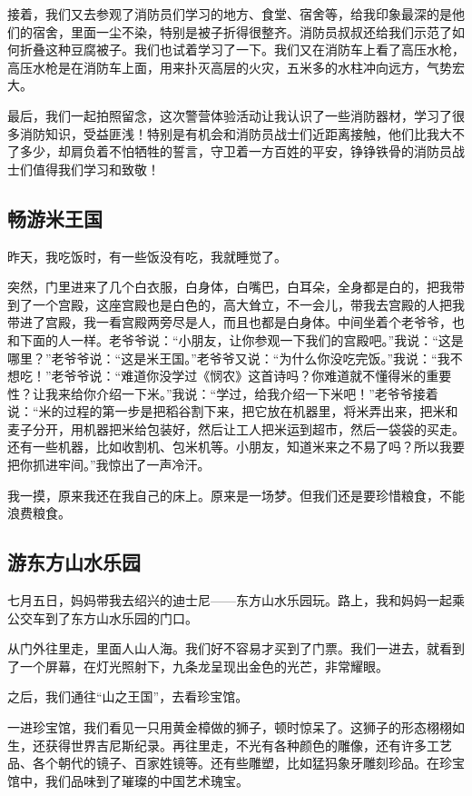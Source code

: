 \documentclass[UTF8,a4paper,titlepage,twoside,10.5pt]{article}
\begin{document}
接着，我们又去参观了消防员们学习的地方、食堂、宿舍等，给我印象最深的是他们的宿舍，里面一尘不染，特别是被子折得很整齐。消防员叔叔还给我们示范了如何折叠这种豆腐被子。我们也试着学习了一下。我们又在消防车上看了高压水枪，高压水枪是在消防车上面，用来扑灭高层的火灾，五米多的水柱冲向远方，气势宏大。

最后，我们一起拍照留念，这次警营体验活动让我认识了一些消防器材，学习了很多消防知识，受益匪浅！特别是有机会和消防员战士们近距离接触，他们比我大不了多少，却肩负着不怕牺牲的誓言，守卫着一方百姓的平安，铮铮铁骨的消防员战士们值得我们学习和致敬！

\subsection{畅游米王国}
\label{sec:orge107d45}

昨天，我吃饭时，有一些饭没有吃，我就睡觉了。

突然，门里进来了几个白衣服，白身体，白嘴巴，白耳朵，全身都是白的，把我带到了一个宫殿，这座宫殿也是白色的，高大耸立，不一会儿，带我去宫殿的人把我带进了宫殿，我一看宫殿两旁尽是人，而且也都是白身体。中间坐着个老爷爷，也和下面的人一样。老爷爷说：“小朋友，让你参观一下我们的宫殿吧。”我说：“这是哪里？”老爷爷说：“这是米王国。”老爷爷又说：“为什么你没吃完饭。”我说：“我不想吃！”老爷爷说：“难道你没学过《悯农》这首诗吗？你难道就不懂得米的重要性？让我来给你介绍一下米。”我说：“学过，给我介绍一下米吧！”老爷爷接着说：“米的过程的第一步是把稻谷割下来，把它放在机器里，将米弄出来，把米和麦子分开，用机器把米给包装好，然后让工人把米运到超市，然后一袋袋的买走。还有一些机器，比如收割机、包米机等。小朋友，知道米来之不易了吗？所以我要把你抓进牢间。”我惊出了一声冷汗。

我一摸，原来我还在我自己的床上。原来是一场梦。但我们还是要珍惜粮食，不能浪费粮食。

\subsection{游东方山水乐园}
\label{sec:orge77736d}

七月五日，妈妈带我去绍兴的迪士尼——东方山水乐园玩。路上，我和妈妈一起乘公交车到了东方山水乐园的门口。

从门外往里走，里面人山人海。我们好不容易才买到了门票。我们一进去，就看到了一个屏幕，在灯光照射下，九条龙呈现出金色的光芒，非常耀眼。

之后，我们通往“山之王国”，去看珍宝馆。

一进珍宝馆，我们看见一只用黄金樟做的狮子，顿时惊呆了。这狮子的形态栩栩如生，还获得世界吉尼斯纪录。再往里走，不光有各种颜色的雕像，还有许多工艺品、各个朝代的镜子、百家姓镜等。还有些雕塑，比如猛犸象牙雕刻珍品。在珍宝馆中，我们品味到了璀璨的中国艺术瑰宝。
\end{document}

